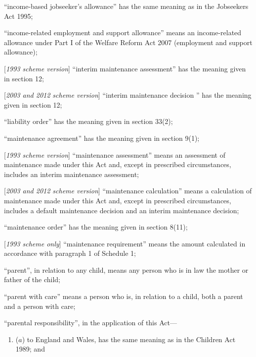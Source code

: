 \documentclass[12pt,a4paper]{article}
\begin{document}
\begin{enumerate}
“income-based jobseeker’s allowance” has the same meaning as in the Jobseekers Act 1995;

“income-related employment and support allowance” means an income-related allowance under Part I of the Welfare Reform Act 2007 (employment and support allowance);

    [\emph{1993 scheme version}] “interim maintenance assessment” has the meaning given in section 12;

    [\emph{2003 and 2012 scheme version}] “interim maintenance 
decision%
” has the meaning given in section 12;

    “liability order” has the meaning given in section 33(2);

    “maintenance agreement” has the meaning given in section 9(1);

    [\emph{1993 scheme version}] “maintenance assessment” means an assessment of maintenance made under this Act and, except in prescribed circumstances, includes an interim maintenance assessment;

[\emph{2003 and 2012 scheme version}] “maintenance calculation” means a calculation of maintenance made under this Act and, except in prescribed circumstances, includes a default maintenance decision and an interim maintenance decision;

    “maintenance order” has the meaning given in section 8(11);

[\emph{1993 scheme only}]         “maintenance requirement” means the amount calculated in accordance with paragraph 1 of Schedule 1;

    “parent”, in relation to any child, means any person who is in law the mother or father of the child;

“parent with care” means a person who is, in relation to a child, both a parent and a person with care;


“parental responsibility”, in the application of this Act—
\begin{enumerate}\item[]
($a$) to England and Wales, has the same meaning as in the Children Act 1989; and


\end{enumerate}
\end{enumerate}
\end{document}

